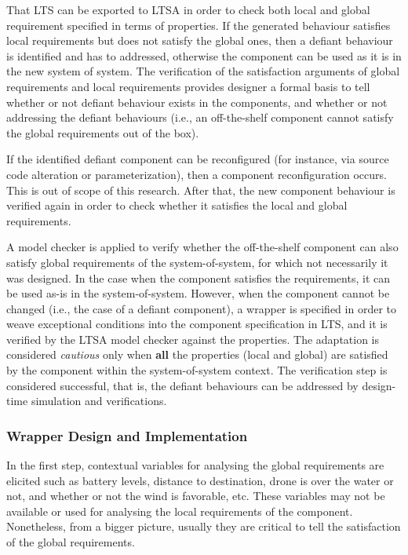 That LTS can be exported to LTSA in order to check both local and global requirement specified in terms of properties. If the generated behaviour satisfies local requirements but does not satisfy the global ones, then a defiant behaviour is identified and has to addressed, otherwise the component can be used as it is in the new system of system.
The verification of the satisfaction arguments of global requirements and local requirements provides designer a formal basis to tell whether or not defiant behaviour exists in the components, and whether or not addressing the defiant behaviours (i.e., an off-the-shelf component cannot satisfy the global requirements out of the box). 

If the identified defiant component can be reconfigured (for instance, via source code alteration or parameterization), then a component reconfiguration occurs. This is out of scope of this research. After that, the new component behaviour is verified again in order to check whether it satisfies the local and global requirements. 

A model checker is applied to verify whether the off-the-shelf component can also satisfy  global requirements of the system-of-system, for which not necessarily it was designed. In the case when the component satisfies the requirements, it can be used as-is in the system-of-system. However, when the component cannot be changed (i.e., the case of a defiant component), a wrapper is specified in order to weave exceptional conditions into the component specification in LTS, and it is verified by the LTSA model checker against the properties.  The adaptation is considered {\it cautious} only when {\bf all} the properties (local and global) are satisfied by the component within the system-of-system context. The verification step is considered successful, that is, the defiant behaviours can be addressed by design-time simulation and verifications. 

\subsubsection{Wrapper Design and Implementation}

In the first step, contextual variables for analysing the global requirements are elicited such as battery levels, distance to destination, drone is over the water or not, and whether or not the wind is favorable, etc.  These variables may not be available or used for analysing the local requirements of the component. Nonetheless, from a bigger picture, usually they are critical to tell the satisfaction of the global requirements. 

